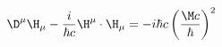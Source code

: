 \begin{equation}
  \label{eq:ConEq}
  \D^\mu\H_\mu- \frac{i}{\hbar c}\H^\mu \cdot \H_\mu = -i\hbar c\left(\frac{\M c}{\hbar} \right)^2
\end{equation}

